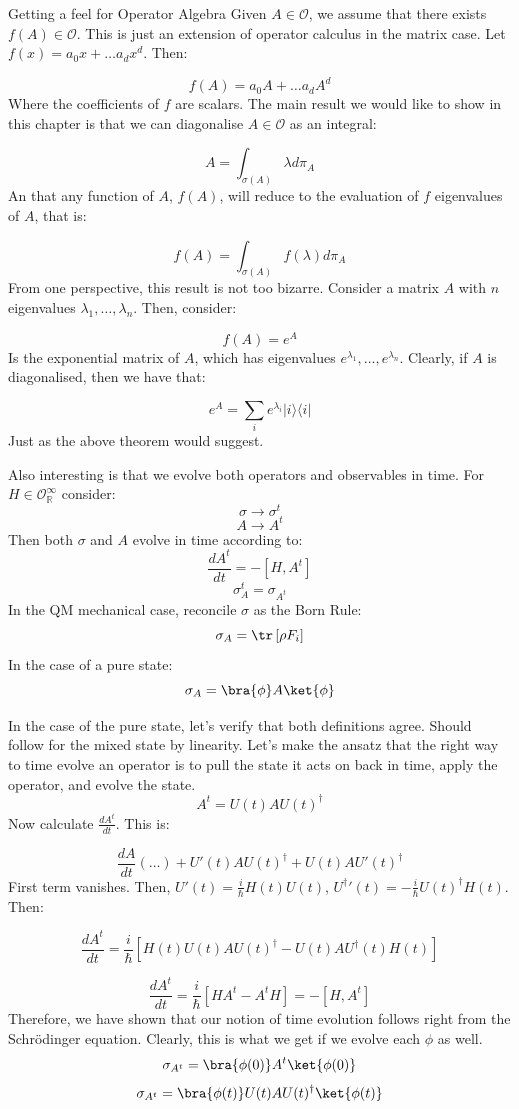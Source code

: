 \begin{example}{Getting a feel for Operator Algebra}
Given $A \in \mathcal{O}$, we assume that there exists $f(A) \in \mathcal{O}$. This is just an extension of operator calculus in the matrix case. Let $f(x) = a_{0} x + \dots a_{d} x^{d}$. Then:

$$f(A) = a_{0} A + \dots a_{d} A^{d}$$
Where the coefficients of $f$ are scalars. The main result we would like to show in this chapter is that we can diagonalise $A \in \mathcal{O}$ as an integral:

$$A = \int_{\sigma(A)} \lambda d \pi_{A}$$
An that any function of $A$, $f(A)$, will reduce to the evaluation of $f$ eigenvalues of $A$, that is:

$$f(A) = \int_{\sigma(A)} f(\lambda) d \pi_{A}$$
From one perspective, this result is not too bizarre. Consider a matrix $A$ with $n$ eigenvalues $\lambda_{1}, \dots, \lambda_{n}$. Then, consider:

$$f(A) = e^{A}$$
Is the exponential matrix of $A$, which has eigenvalues $e^{\lambda_{1}}, \dots, e^{\lambda_{n}}$. Clearly, if $A$ is diagonalised, then we have that:

$$e^{A} = \sum_{i} e^{\lambda_{i}} \vert i \rangle \langle i \vert$$
Just as the above theorem would suggest. 
\end{example} 

Also interesting is that we evolve both operators and observables in time. For $H \in \mathcal{O}^{\infty}_{\mathbb{R}}$ consider:
$$\sigma \to \sigma^{t}$$
$$A \to A^{t}$$
Then both $\sigma$ and $A$ evolve in time according to:
$$\frac{d A^{t}}{dt} = - [H, A^{t}]$$
$$\sigma^{t}_{A} = \sigma_{A^{t}}$$
In the QM mechanical case, reconcile $\sigma$ as the Born Rule:
$$\sigma_{A} = \tr \left[ \rho F_{i} \right ]$$
In the case of a pure state:
$$\sigma_{A} = \bra{\phi} A \ket{ \phi}$$

\begin{example}
In the case of the pure state, let's verify that both definitions agree. 
Should follow for the mixed state by linearity. Let's make the ansatz that the right way to time evolve an operator is to pull the state it acts on back in time, apply the operator, and evolve the state. 
$$A^{t} = U(t) A U(t)^{\dag}$$
Now calculate $\frac{d A^{t}}{dt}$. This is:

$$\frac{dA}{dt} (\dots) + U'(t) A U(t)^{\dag} + U(t) A U'(t)^{\dag} $$
First term vanishes. Then, $U'(t) = \frac{i}{\hbar} H(t) U(t)$, ${U^{\dag}}'(t) = -\frac{i}{\hbar} U(t)^{\dag} H(t)$. Then:

$$\frac{d A^{t}}{dt} = \frac{i}{\hbar} \left[ H(t) U(t) A U(t)^{\dag} - U(t) A U^{\dag}(t) H(t) \right]$$

$$\frac{d A^{t}}{dt} = \frac{i}{\hbar} \left[H A^{t} - A^{t} H \right] = -[H, A^{t}]$$
Therefore, we have shown that our notion of time evolution follows right from the Schrödinger equation. Clearly, this is what we get if we evolve each $\phi$ as well. 
$$\sigma_{A^{t}} = \bra{\phi(0)} A^{t} \ket{ \phi(0)}$$
$$\sigma_{A^{t}} = \bra{\phi(t)} U(t) A U(t)^{\dag} \ket{ \phi(t)}$$
\end{example}

